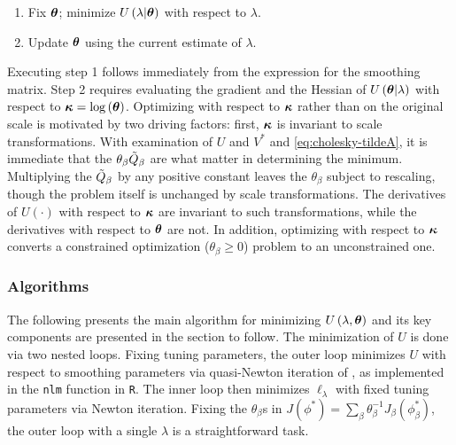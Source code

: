 \begin{enumerate}
\item Fix $\mbox{\boldmath $\theta$}$; minimize $U\left(\lambda \vert \mbox{\boldmath $\theta$}\right)$ with respect to $\lambda$.
\item Update $\mbox{\boldmath $\theta$}$ using the current estimate of $\lambda$.
\end{enumerate}
\noindent
Executing step 1 follows immediately from the expression for the smoothing matrix. Step 2 requires evaluating the gradient and the Hessian of $U\left( \mbox{\boldmath $\theta$} \vert \lambda \right)$ with respect to $\mbox{\boldmath $\kappa$} = \log\left(\mbox{\boldmath $\theta$}\right)$. Optimizing with respect to $\mbox{\boldmath $\kappa$}$ rather than on the original scale is motivated by two driving factors: first, $\mbox{\boldmath $\kappa$}$ is invariant to scale transformations. With examination of $U$ and $V^*$ and \ref{eq:cholesky-tildeA}, it is immediate that the $\theta_\beta \tilde{Q}_\beta$ are what matter in determining the minimum. Multiplying the $\tilde{Q}_\beta$ by any positive constant leaves the $\theta_\beta$ subject to rescaling, though the problem itself is unchanged by scale transformations. The derivatives of $U\left(\cdot\right)$ with respect to $\mbox{\boldmath $\kappa$}$ are invariant to such transformations, while the derivatives with respect to $\mbox{\boldmath $\theta$}$ are not. In addition, optimizing with respect to $\mbox{\boldmath $\kappa$}$ converts a constrained optimization ($\theta_\beta \ge 0$) problem to an unconstrained one.

\subsubsection{Algorithms}

The following presents the main algorithm for minimizing $U\left(\lambda, \mbox{\boldmath $\theta$} \right)$ and its key components are presented in the section to follow. The minimization of $U$ is done via two nested loops. Fixing tuning parameters, the outer loop minimizes $U$ with respect to smoothing parameters via quasi-Newton iteration of \citet{dennis1996numerical}, as implemented in the \texttt{nlm} function in \texttt{R}. The inner loop then minimizes $\ell_\lambda$ with fixed tuning parameters via Newton iteration. Fixing the $\theta_\beta$s in $J \left(\phi^*\right) = \sum_\beta \theta^{-1}_\beta J_\beta \left(\phi_\beta^*\right)$, the outer loop with a single $\lambda$ is a straightforward task. 

